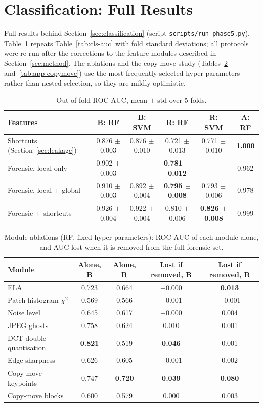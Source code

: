 \section{Classification: Full Results}\label{app:classification}
\begingroup\sloppy{}
Full results behind Section~\ref{sec:classification} (script \texttt{scripts/run\_phase5.py}). Table~\ref{tab:app-cls-auc} repeats Table~\ref{tab:cls-auc} with fold standard deviations; all protocols were re-run after the corrections to the feature modules described in Section~\ref{sec:method}. The ablations and the copy-move study (Tables~\ref{tab:app-ablation} and~\ref{tab:app-copymove}) use the most frequently selected hyper-parameters rather than nested selection, so they are mildly optimistic.

\begin{table}[!ht]
\centering
\caption{Out-of-fold ROC-AUC, mean $\pm$ std over 5 folds.}
\label{tab:app-cls-auc}
\footnotesize
\begin{tabular}{lccccc}
\toprule
Features & B: RF & B: SVM & R: RF & R: SVM & A: RF \\
\midrule
Shortcuts (Section~\ref{sec:leakage}) & 0.876 $\pm$ 0.003 & 0.876 $\pm$ 0.010 & 0.721 $\pm$ 0.013 & 0.771 $\pm$ 0.010 & \textbf{1.000} \\
Forensic, local only & 0.902 $\pm$ 0.003 & -- & \textbf{0.781 $\pm$ 0.012} & -- & 0.962 \\
Forensic, local + global & 0.910 $\pm$ 0.003 & 0.892 $\pm$ 0.004 & \textbf{0.795 $\pm$ 0.008} & 0.793 $\pm$ 0.006 & 0.978 \\
Forensic + shortcuts & 0.926 $\pm$ 0.004 & 0.922 $\pm$ 0.004 & 0.810 $\pm$ 0.006 & \textbf{0.826 $\pm$ 0.008} & 0.999 \\
\bottomrule
\end{tabular}
\end{table}

\begin{table}[!ht]
\centering
\caption{Module ablations (RF, fixed hyper-parameters): ROC-AUC of each module alone, and AUC lost when it is removed from the full forensic set.}
\label{tab:app-ablation}
\footnotesize
\begin{tabular}{lcccc}
\toprule
Module & Alone, B & Alone, R & Lost if removed, B & Lost if removed, R \\
\midrule
ELA & 0.723 & 0.664 & $-$0.000 & \textbf{0.013} \\
Patch-histogram $\chi^2$ & 0.569 & 0.566 & $-$0.001 & $-$0.001 \\
Noise level & 0.645 & 0.617 & $-$0.000 & 0.004 \\
JPEG ghosts & 0.758 & 0.624 & 0.010 & 0.001 \\
DCT double quantisation & \textbf{0.821} & 0.519 & \textbf{0.046} & 0.001 \\
Edge sharpness & 0.626 & 0.605 & $-$0.001 & 0.002 \\
Copy-move keypoints & 0.747 & \textbf{0.720} & \textbf{0.039} & \textbf{0.080} \\
Copy-move blocks & 0.600 & 0.579 & 0.000 & 0.003 \\
\bottomrule
\end{tabular}
\end{table}

